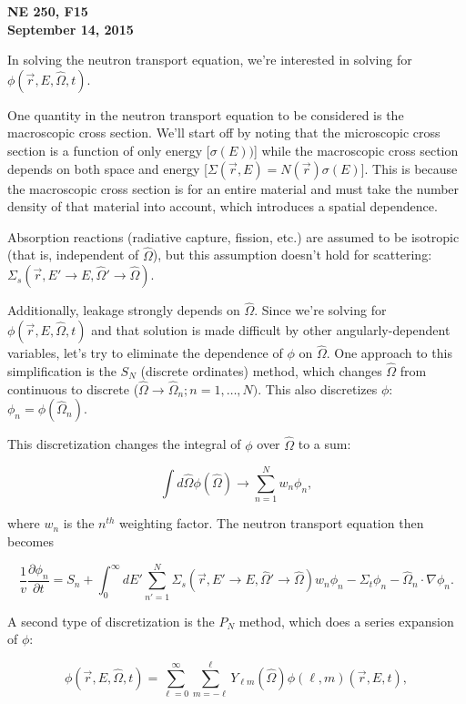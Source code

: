 \documentclass[12pt]{article}
\newcommand{\rvec}{\ensuremath{\vec{r}}}
\newcommand{\omvec}{\ensuremath{\hat{\Omega}}}
\newcommand{\sigs}{\ensuremath{\Sigma_s(\rvec,E'\rightarrow E,\omvec'\rightarrow\omvec)}}
\newcommand{\el}{\ensuremath{\ell}}
\begin{document}
\begin{center}
{\bf NE 250, F15 \\
September 14, 2015}
\end{center}

In solving the neutron transport equation, we're interested in solving for $\phi(\rvec, E, \omvec, t)$.


One quantity in the neutron transport equation to be considered is the macroscopic cross section. We'll
start off by noting that the microscopic cross section is a function of only energy [$\sigma(E))$] while
the macroscopic cross section depends on both space and energy [$\Sigma(\rvec,E) = N(\rvec)\sigma(E)$].
This is because the macroscopic cross section is for an entire material and must take the number density
of that material into account, which introduces a spatial dependence.


Absorption reactions (radiative capture, fission, etc.) are assumed to be isotropic (that is, independent
of $\omvec$), but this assumption doesn't hold for scattering: $\sigs$.


Additionally, leakage strongly depends on $\omvec$. Since we're solving for $\phi(\rvec, E, \omvec, t)$
and that solution is made difficult by other angularly-dependent variables, let's try to eliminate the
dependence of $\phi$ on $\omvec$. One approach to this simplification is the $S_N$ (discrete ordinates)
method, which changes $\omvec$ from continuous to discrete ($\omvec \rightarrow \omvec_n; n = 1,\dots,N)$.
This also discretizes $\phi$: $\phi_n = \phi(\omvec_n)$.


This discretization changes the integral of $\phi$ over $\omvec$ to a sum:

\begin{equation*}
\int d\omvec\phi(\omvec) \rightarrow \sum^{N}_{n=1}w_n\phi_n,
\end{equation*}

where $w_n$ is the $n^{th}$ weighting factor. The neutron transport equation then becomes

\begin{equation*}
\frac{1}{v}\frac{\partial\phi_n}{\partial t} = 
S_n + \int^{\infty}_{0}dE'\sum_{n'=1}^{N}\sigs w_n\phi_n-\Sigma_t\phi_n
-\omvec_n\cdot\nabla\phi_n.
\end{equation*}

A second type of discretization is the $P_N$ method, which does a series expansion of $\phi$:

\begin{equation*}
\phi(\rvec,E,\omvec,t) =\sum_{\el=0}^{\infty}\sum_{m=-\ell}^{\ell}Y_{\el m}(\omvec)\phi(\el,m)(\rvec,E,t),
\end{equation*}
\end{document}
